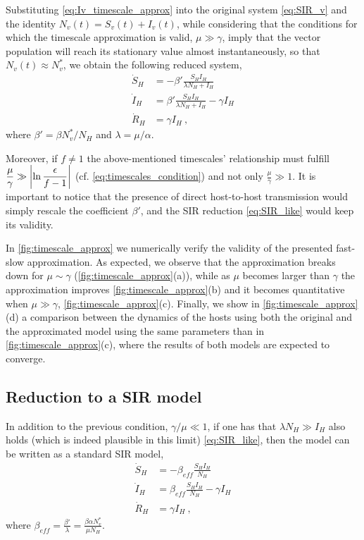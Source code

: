 Substituting \cref{eq:Iv_timescale_approx} into the original system
\cref{eq:SIR_v} and the identity $N_v(t)=S_v(t)+I_v(t)$, while considering that
the conditions for which the timescale approximation is valid, $\mu\gg\gamma$,
imply that the vector population will reach its stationary value almost
instantaneously, so that $N_v(t)\approx N_v^*$, we obtain the following reduced
system,
\begin{equation}\label{eq:SIR_like}
    \begin{aligned}
        \dot{S}_H & =-\beta'\frac{S_H I_H}{\lambda N_H + I_H}            \\
        \dot{I}_H & =\beta'\frac{S_H I_H}{\lambda N_H + I_H}- \gamma I_H \\
        \dot{R}_H & =\gamma I_H \ ,
    \end{aligned}
\end{equation}
where $\beta'=\beta N_v^*/N_H$ and $\lambda=\mu/\alpha$.

Moreover, if $f\neq1$ the above-mentioned timescales' relationship
must fulfill
$\displaystyle\frac{\mu}{\gamma}\gg\abs{\ln{\frac{\epsilon}{f-1}}}$ (cf.
\cref{eq:timescales_condition}) and not only
$\displaystyle\frac{\mu}{\gamma}\gg 1$. It is important to notice that the
presence of direct host-to-host transmission would simply rescale the
coefficient $\beta'$, and the SIR reduction \cref{eq:SIR_like} would keep its
validity.

In \cref{fig:timescale_approx} we numerically verify the validity of the
presented fast-slow approximation. As expected, we observe that the
approximation breaks down for $\mu\sim\gamma$ (\cref{fig:timescale_approx}(a)),
while as $\mu$ becomes larger than $\gamma$ the approximation improves
\cref{fig:timescale_approx}(b) and it becomes quantitative when $\mu\gg\gamma$,
\cref{fig:timescale_approx}(c). Finally, we show in
\cref{fig:timescale_approx}(d) a comparison between the dynamics of the hosts
using both the original and the approximated model using the same parameters
than in \cref{fig:timescale_approx}(c), where the results of both models are
expected to converge.

\subsection{Reduction to a SIR model}

In addition to the previous condition, $\gamma/\mu\ll1$, if one has that
$\lambda N_H \gg I_H$ also holds (which is indeed plausible in this limit)
\cref{eq:SIR_like}, then the model can be written as a standard SIR model,
\begin{equation}\label{eq:SIR}
    \begin{aligned}
        \dot{S}_H & =-\beta_{eff}\frac{S_HI_H}{N_H}            \\
        \dot{I}_H & =\beta_{eff}\frac{S_HI_H}{N_H}- \gamma I_H \\
        \dot{R}_H & =\gamma I_H \ ,
    \end{aligned}
\end{equation}
where $\displaystyle\beta_{eff}=\frac{\beta'}{\lambda}=\frac{\beta\alpha
        N_v^*}{\mu N_H}$.

